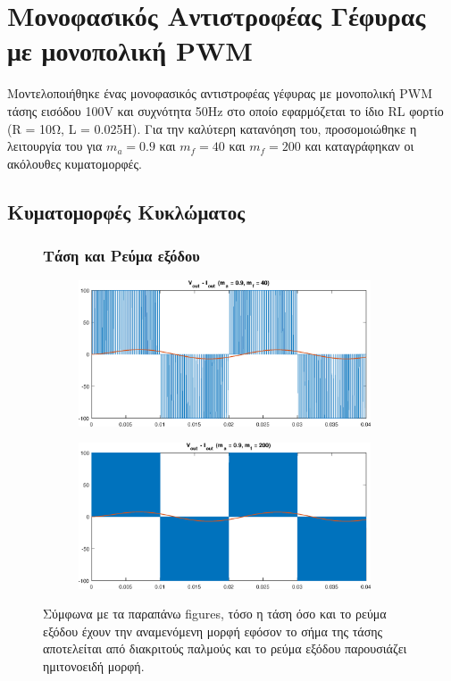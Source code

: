 \section{Μονοφασικός Αντιστροφέας Γέφυρας με μονοπολική PWM}
Μοντελοποιήθηκε ένας μονοφασικός αντιστροφέας γέφυρας με μονοπολική PWM τάσης εισόδου 100V και συχνότητα 50Hz στο οποίο εφαρμόζεται το ίδιο RL φορτίο (R = 10Ω, L = 0.025Η). Για την καλύτερη κατανόηση του, προσομοιώθηκε η λειτουργία του για $m_a = 0.9$ και $m_f = 40$  και $m_f = 200$ και καταγράφηκαν οι ακόλουθες κυματομορφές.

\subsection{Κυματομορφές Κυκλώματος}

\begin{figure}[h!]
	\subsubsection*{Τάση και Ρεύμα εξόδου}
	\begin{subfigure}{0.49\textwidth}
		\centering
		\includegraphics[width=0.95\textwidth]{Images/V_out_I_out_40}
	\end{subfigure}
	\begin{subfigure}{0.49\textwidth}
		\centering
		\includegraphics[width=0.95\textwidth]{Images/V_out_I_out_200}
	\end{subfigure}
	\noindent
	Σύμφωνα με τα παραπάνω figures, τόσο η τάση όσο και το ρεύμα εξόδου έχουν την αναμενόμενη μορφή εφόσον το σήμα της τάσης αποτελείται από διακριτούς παλμούς και το ρεύμα εξόδου παρουσιάζει ημιτονοειδή μορφή.

\end{figure}
